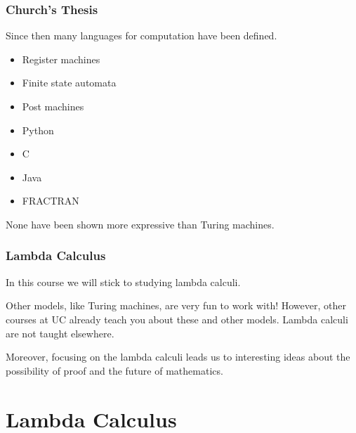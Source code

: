 \documentclass{beamer}
\begin{document}
\begin{frame}
	\frametitle{Church's Thesis}

	Since then many languages for computation have been defined. 

	\begin{itemize}
		\item Register machines
		\item Finite state automata
		\item Post machines
		\item Python
		\item C
		\item Java
		\item FRACTRAN
	\end{itemize}

	None have been shown more expressive than Turing machines.
\end{frame}

\begin{frame}
	\frametitle{Lambda Calculus}

	In this course we will stick to studying lambda calculi. 

	Other models, like Turing machines, are very fun to work with! However, other courses at UC already teach you about these and other models. Lambda calculi are not taught elsewhere. 

	Moreover, focusing on the lambda calculi leads us to interesting ideas about the possibility of proof and the future of mathematics. 

\end{frame}

\section{Lambda Calculus}
\end{document}
